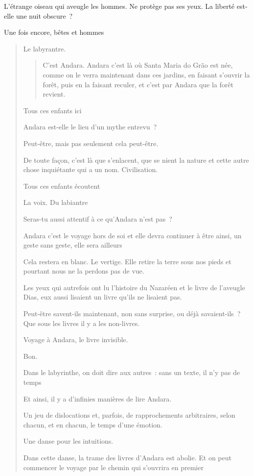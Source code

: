 L'étrange oiseau qui aveugle les hommes. Ne protège pas ses yeux. La
liberté est-elle une nuit obscure~?

Une fois encore, bêtes et hommes

\begin{quote}
Le labyrantre.

\begin{quote}
C'est Andara. Andara c'est là où Santa Maria do Grão est née, comme on
le verra maintenant dans ces jardins, en faisant s'ouvrir la forêt, puis
en la faisant reculer, et c'est par Andara que la forêt revient.
\end{quote}

Tous ces enfants ici

Andara est-elle le lieu d'un mythe entrevu~?

Peut-être, mais pas seulement cela peut-être.

De toute façon, c'est là que s'enlacent, que se nient la nature et cette
autre chose inquiétante qui a un nom. Civilisation.

Tous ces enfants écoutent

La voix. Du labiantre

Seras-tu aussi attentif à ce qu'Andara n'est pas~?

Andara c'est le voyage hors de soi et elle devra continuer à être ainsi,
un geste sans geste, elle sera ailleurs

Cela restera en blanc. Le vertige. Elle retire la terre sous nos pieds
et pourtant nous ne la perdons pas de vue.

Les yeux qui autrefois ont lu l'histoire du Nazaréen et le livre de
l'aveugle Dias, eux aussi lisaient un livre qu'ils ne lisaient pas.

Peut-être savent-ils maintenant, non sans surprise, ou déjà
savaient-ils~? Que sous les livres il y a les non-livres.

Voyage à Andara, le livre invisible.

Bon.

Dans le labyrinthe, on doit dire aux autres~: sans un texte, il n'y pas
de temps

Et ainsi, il y a d'infinies manières de lire Andara.

Un jeu de dislocations et, parfois, de rapprochements arbitraires, selon
chacun, et en chacun, le temps d'une émotion.

Une danse pour les intuitions.

Dans cette danse, la trame des livres d'Andara est abolie. Et on peut
commencer le voyage par le chemin qui s'ouvrira en premier
\end{quote}

